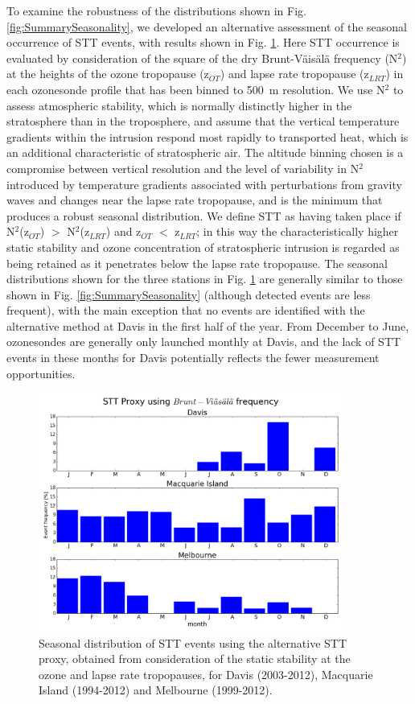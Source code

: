 \documentclass[acp, manuscript]{copernicus} %
\begin{document}
  To examine the robustness of the distributions shown in Fig. \ref{fig:SummarySeasonality}, we developed an alternative assessment of the seasonal occurrence of STT events, with results shown in Fig. \ref{fig:AndrewProxySTT}.
  Here STT occurrence is evaluated by consideration of the square of the dry Brunt-V\"{a}is\"{a}l\"{a} frequency (N$^2$) at the heights of the ozone tropopause (z$_{OT}$) and lapse rate tropopause (z$_{LRT}$) in each ozonesonde profile that has been binned to 500~m resolution.
  We use N$^2$ to assess atmospheric stability, which is normally distinctly higher in the stratosphere than in the troposphere, and assume that the vertical temperature gradients within the intrusion respond most rapidly to transported heat, which is an additional characteristic of stratospheric air.
  The altitude binning chosen is a compromise between vertical resolution and the level of variability in N$^2$ introduced by temperature gradients associated with perturbations from gravity waves and changes near the lapse rate tropopause, and is the minimum that produces a robust seasonal distribution.
  We define STT as having taken place if N$^2$(z$_{OT}$) $>$ N$^2$(z$_{LRT}$) and z$_{OT}$ $<$ z$_{LRT}$; in this way the characteristically higher static stability and ozone concentration of stratospheric intrusion is regarded as being retained as it penetrates below the lapse rate tropopause. 
  The seasonal distributions shown for the three stations in Fig. \ref{fig:AndrewProxySTT} are generally similar to those shown in Fig. \ref{fig:SummarySeasonality} (although detected events are less frequent), with the main exception that no events are identified with the alternative method at Davis in the first half of the year.
  From December to June, ozonesondes are generally only launched monthly at Davis, and the lack of STT events in these months for Davis potentially reflects the fewer measurement opportunities.
  
  \begin{figure}[t]
    \includegraphics[width=10cm]{figures/AndrewProxySTT.png}
    \caption{Seasonal distribution of STT events using the alternative STT proxy, obtained from consideration of the static stability at the ozone and lapse rate tropopauses, for Davis (2003-2012), Macquarie Island (1994-2012) and Melbourne (1999-2012).}
    \label{fig:AndrewProxySTT}
    
  \end{figure}
  
\end{document}
